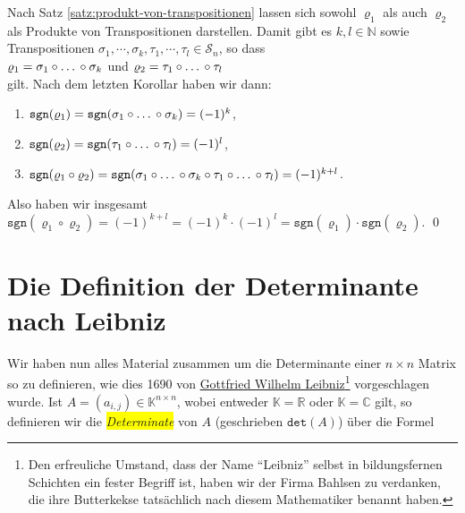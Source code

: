 \proof
Nach Satz \ref{satz:produkt-von-transpositionen} lassen sich sowohl $\varrho_1$ als auch $\varrho_2$ als
Produkte von Transpositionen darstellen.  Damit gibt es $k,l \in \mathbb{N}$ sowie
Transpositionen $\sigma_1, \cdots, \sigma_{k}, \tau_1, \cdots, \tau_l \in \mathcal{S}_n$, so dass
\\[0.2cm]
\hspace*{1.3cm}
$\varrho_1 = \sigma_1 \circ \mbox{\dots} \circ \sigma_{k}$ \quad und \quad
 $\varrho_2 = \tau_1 \circ \mbox{\dots} \circ \tau_l$
\\[0.2cm]
gilt.   Nach dem letzten Korollar haben wir dann: 
\begin{enumerate}
\item $\mathtt{sgn}(\varrho_1) = \mathtt{sgn}(\sigma_1 \circ \mbox{\dots} \circ \sigma_{k}) = (-1)^k$, 
\item $\mathtt{sgn}(\varrho_2) = \mathtt{sgn}(\tau_1 \circ \mbox{\dots} \circ \tau_l) = (-1)^l$,
\item $\mathtt{sgn}(\varrho_1 \circ \varrho_2) = 
       \mathtt{sgn}(\sigma_1 \circ \mbox{\dots} \circ \sigma_{k} \circ \tau_1 \circ \mbox{\dots} \circ \tau_l) = (-1)^{k+l}$.
\end{enumerate}
Also haben wir insgesamt
\\[0.2cm]
\hspace*{1.3cm}
$\mathtt{sgn}(\varrho_1 \circ \varrho_2) = (-1)^{k+l} = (-1)^k \cdot (-1)^l = \mathtt{sgn}(\varrho_1) \cdot \mathtt{sgn}(\varrho_2)$.  
\qed

\section{Die Definition der Determinante nach Leibniz}
Wir haben nun alles Material zusammen um die Determinante einer $n \times n$ Matrix so zu
definieren, wie dies 1690 von
\href{http://de.wikipedia.org/wiki/Gottfried_Wilhelm_Leibniz}{Gottfried Wilhelm Leibniz\footnote{
  Den erfreuliche Umstand, dass der Name ``Leibniz'' selbst in bildungsfernen Schichten ein fester
  Begriff ist, haben wir   der Firma \href{http://www.bahlsen.com}{Bahlsen} zu verdanken, die ihre
  \href{http://en.wikipedia.org/wiki/Leibniz-Keks}{Butterkekse} tats\"achlich nach diesem Mathematiker
  benannt haben.
}} 
vorgeschlagen wurde.  Ist $A = (a_{i,j}) \in \mathbb{K}^{n \times n}$, wobei entweder 
$\mathbb{K}= \mathbb{R}$ oder $\mathbb{K}= \mathbb{C}$ gilt, so definieren wir die
\colorbox{yellow}{\emph{Determinate}} von $A$ (geschrieben $\mathtt{det}(A)$) \"uber die Formel
\\[0.2cm]
\hspace*{1.3cm}
\colorbox{red}{}

